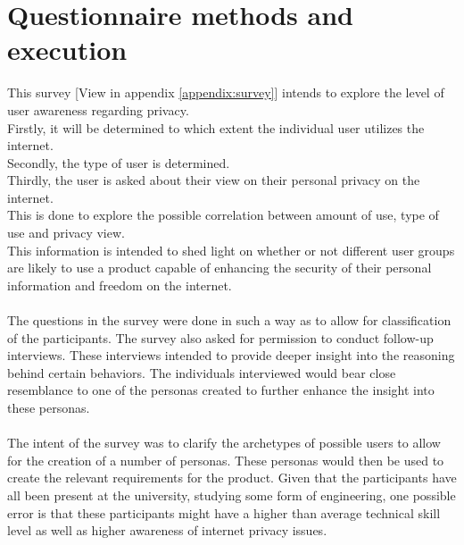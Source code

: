 \section{Questionnaire methods and execution}
\noindent
This survey [View in appendix \ref{appendix:survey}] intends to explore the level of user awareness regarding privacy. \\
Firstly, it will be determined to which extent the individual user utilizes the internet.\\ 
Secondly, the type of user is determined. \\
Thirdly, the user is asked about their view on their personal privacy on the internet.\\
This is done to explore the possible correlation between amount of use, type of use and privacy view. \\
This information is intended to shed light on whether or not different user groups are likely to use a product capable of enhancing the security of their personal information and freedom on the internet.\\\\
\noindent
The questions in the survey were done in such a way as to allow for classification of the participants.
The survey also asked for permission to conduct follow-up interviews. These interviews intended to provide deeper insight into the reasoning behind certain behaviors. The individuals interviewed would bear close resemblance to one of the personas created to further enhance the insight into these personas.\\\\
\noindent
The intent of the survey was to clarify the archetypes of possible users to allow for the creation of a number of personas. These personas would then be used to create the relevant requirements for the product.
\noindent
Given that the participants have all been present at the university, studying some form of engineering, one possible error is that these participants might have a higher than average technical skill level as well as higher awareness of internet privacy issues.